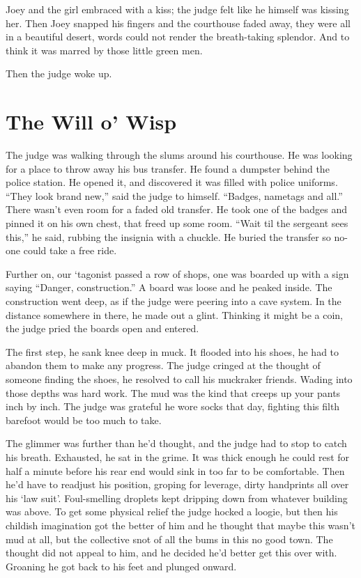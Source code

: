 \documentclass[oneside]{book}
\begin{document}
Joey and the girl embraced with a kiss; the judge
felt like he himself was kissing her.  Then Joey snapped his
fingers and the courthouse faded away, they were all in a beautiful
desert, words could not render the breath-taking splendor.
And to think it was marred by those little green men.

Then the judge woke up.




\chapter{The Will o' Wisp}


The judge was walking through the slums around his courthouse.
He was looking for a place to throw away his bus transfer.
He found a dumpster behind the police station.
He opened it, and discovered it was filled with police uniforms.
``They look brand new,'' said the judge to himself.
``Badges, nametags and all.''  There wasn't even room for a faded old transfer.
He took one of the badges and pinned it on his own chest, that freed up some
room.  ``Wait til the sergeant sees this,'' he said, rubbing the insignia with a chuckle.
He  buried the transfer so no-one could take a free ride.

Further on, our `tagonist passed a row of shops, one was boarded up with a sign
saying ``Danger, construction.''
A board was loose and he peaked inside.
The construction went deep, as if the judge were peering into a cave system.
In the distance somewhere in there, he made out a glint.  Thinking it might be a coin,
the judge pried the boards open and entered.

The first step, he sank knee deep in muck.  It flooded into his shoes,
he had to abandon them to make any progress.  The judge cringed at the thought
of someone finding the shoes, he resolved to call his muckraker friends.
Wading into those depths was hard work.  The mud was the kind that creeps up
your pants inch by inch.  The judge was grateful he wore socks that day,
fighting this filth barefoot would be too much to take.

The glimmer was further than he'd thought, and the judge had to stop to catch his breath.
Exhausted, he sat in the grime.  It was thick enough he could rest for half a minute before
his rear end would sink in too far to be comfortable.  Then he'd have to readjust his
position, groping for leverage, dirty handprints all over his `law suit'.
Foul-smelling droplets kept dripping down from whatever building was above.
To get some physical relief the judge hocked a loogie, but then his childish imagination
got the better of him and he thought that maybe this wasn't mud at all, but the collective
snot of all the bums in this no good town.  The thought did not appeal to him, and he
decided he'd better get this over with.  Groaning he got back to his feet and plunged
onward.
\end{document}
